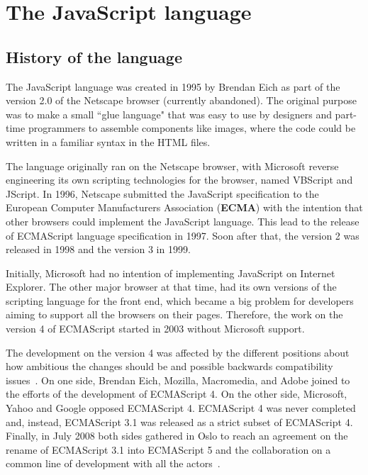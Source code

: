 \documentclass{uvamscse}
\begin{document}
\section{The JavaScript language}
\subsection{History of the language}
The JavaScript language was created in 1995 by Brendan Eich as part of the version 2.0 of the Netscape browser (currently abandoned). The original purpose was to make a small ``glue language" that was easy to use by designers and part-time programmers to assemble components like images, where the code could be written in a familiar syntax in the HTML files.

The language originally ran on the Netscape browser, with Microsoft reverse engineering its own scripting technologies for the browser, named VBScript and JScript. In 1996, Netscape submitted the JavaScript specification to the European Computer Manufacturers Association (\textbf{ECMA}) with the intention that other browsers could implement the JavaScript language. This lead to the release of ECMAScript language specification in 1997. Soon after that, the version 2 was released in 1998 and the version 3 in 1999.

Initially, Microsoft had no intention of implementing JavaScript on Internet Explorer. The other major browser at that time, had its own versions of the scripting language for the front end, which became a big problem for developers aiming to support all the browsers on their pages. Therefore, the work on the version 4 of ECMAScript started in 2003 without Microsoft support.

The development on the version 4 was affected by the different positions about how ambitious the changes should be and possible backwards compatibility issues~\cite{IEBrokenWeb}. On one side, Brendan Eich, Mozilla, Macromedia, and Adobe joined to the efforts of the development of ECMAScript 4. On the other side, Microsoft, Yahoo and Google opposed ECMAScript 4. ECMAScript 4 was never completed and, instead, ECMAScript 3.1 was released as a strict subset of ECMAScript 4. Finally, in July 2008 both sides gathered in Oslo to reach an agreement on the rename of ECMAScript 3.1 into ECMAScript 5 and the collaboration on a common line of development with all the actors~\cite{TC39Oslo}.
\end{document}

